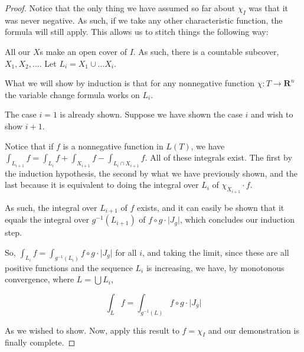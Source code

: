 \documentclass[11pt]{article}
\theoremstyle{definition}
\theoremstyle{plain}
\newcommand{\R}{\mathbf{R}}
\newcommand{\mo}{^{-1}}
\begin{document}
\begin{proof}
Notice that the only thing we have assumed so far about $\chi_I$ was that it was never negative. As such, if we take any other characteristic function, the formula will still apply. This allows us to stitch things the following way:

All our $X$s make an open cover of $I$. As such, there is a countable subcover, $X_1, X_2, \ldots$. Let $L_i = X_1 \cup \ldots X_i$.

What we will show by induction is that for any nonnegative function $\chi : T \rightarrow \R^n$ the variable change formula works on $L_i$.

The case $i = 1$ is already shown. Suppose we have shown the case $i$ and wish to show $i+1$.

Notice that if $f$ is a nonnegative function in $L(T)$, we have $\int_{L_{i+1}} f = \int_{L_i} f + \int_{X_{i+1}} f  - \int_{L_i \cap X_{i+1}} f$. All of these integrals exist. The first by the induction hypothesis, the second by what we have previously shown, and the last because it is equivalent to doing the integral over $L_i$ of $\chi_{X_{i+1}} \cdot f$.

As such, the integral over $L_{i+1}$ of $f$ exists, and it can easily be shown that it equals the integral over $g\mo(L_{i+1})$ of $f \circ g \cdot \lvert J_g \rvert$, which concludes our induction step.

So, $\int_{L_i} f = \int_{g\mo(L_i)} f \circ g \cdot \lvert J_g \rvert$ for all $i$, and taking the limit, since these are all positive functions and the sequence $L_i$ is increasing, we have, by monotonous convergence, where $L = \bigcup L_i$,

\[ \int_L f = \int_{g\mo(L)} f \circ g \cdot \lvert J_g \rvert \]

As we wished to show. Now, apply this result to $f = \chi_I$ and our demonstration is finally complete.

\end{proof}
\end{document}
